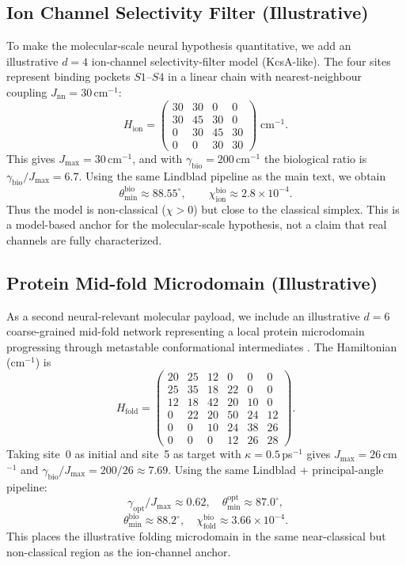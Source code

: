 \documentclass[12pt,a4paper]{article}
\theoremstyle{definition}
\theoremstyle{remark}
\begin{document}
\subsection{Ion Channel Selectivity Filter (Illustrative)}
\label{app:ionchannel}

To make the molecular-scale neural hypothesis quantitative, we add an illustrative $d=4$ ion-channel selectivity-filter model (KcsA-like). The four sites represent binding pockets $S1$--$S4$ in a linear chain with nearest-neighbour coupling $J_{\mathrm{nn}}=30$\,cm$^{-1}$:
\begin{equation}
H_{\mathrm{ion}} =
\begin{pmatrix}
30 & 30 & 0 & 0\\
30 & 45 & 30 & 0\\
0 & 30 & 45 & 30\\
0 & 0 & 30 & 30
\end{pmatrix}\;\mathrm{cm}^{-1}.
\end{equation}
This gives $J_{\max}=30$\,cm$^{-1}$, and with $\gamma_{\mathrm{bio}}=200$\,cm$^{-1}$ the biological ratio is $\gamma_{\mathrm{bio}}/J_{\max}=6.7$. Using the same Lindblad pipeline as the main text, we obtain
\[
\theta_{\min}^{\mathrm{bio}} \approx 88.55^\circ,\qquad
\chi_{\mathrm{ion}}^{\mathrm{bio}} \approx 2.8\times 10^{-4}.
\]
Thus the model is non-classical ($\chi>0$) but close to the classical simplex. This is a model-based anchor for the molecular-scale hypothesis, not a claim that real channels are fully characterized.

\subsection{Protein Mid-fold Microdomain (Illustrative)}
\label{app:protein-fold}

As a second neural-relevant molecular payload, we include an illustrative $d=6$ coarse-grained mid-fold network representing a local protein microdomain progressing through metastable conformational intermediates \cite{onuchic1997theory,dill2008protein}. The Hamiltonian (cm$^{-1}$) is
\begin{equation}
H_{\mathrm{fold}} =
\begin{pmatrix}
20 & 25 & 12 & 0 & 0 & 0 \\
25 & 35 & 18 & 22 & 0 & 0 \\
12 & 18 & 42 & 20 & 10 & 0 \\
0 & 22 & 20 & 50 & 24 & 12 \\
0 & 0 & 10 & 24 & 38 & 26 \\
0 & 0 & 0 & 12 & 26 & 28
\end{pmatrix}.
\end{equation}
Taking site~0 as initial and site~5 as target with $\kappa=0.5$\,ps$^{-1}$ gives $J_{\max}=26$\,cm$^{-1}$ and $\gamma_{\mathrm{bio}}/J_{\max}=200/26\approx7.69$. Using the same Lindblad + principal-angle pipeline:
\[
\gamma_{\mathrm{opt}}/J_{\max}\approx0.62,\quad
\theta_{\min}^{\mathrm{opt}}\approx87.0^\circ,
\]
\[
\theta_{\min}^{\mathrm{bio}}\approx88.2^\circ,\quad
\chi_{\mathrm{fold}}^{\mathrm{bio}}\approx3.66\times10^{-4}.
\]
This places the illustrative folding microdomain in the same near-classical but non-classical region as the ion-channel anchor.
\end{document}
